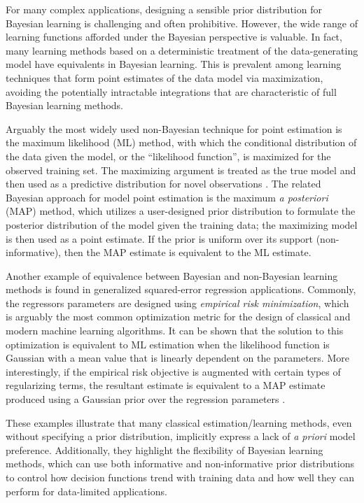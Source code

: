 \documentclass[12pt]{report}
\begin{document}
For many complex applications, designing a sensible prior distribution for Bayesian learning is challenging and often prohibitive. However, the wide range of learning functions afforded under the Bayesian perspective is valuable. In fact, many learning methods based on a deterministic treatment of the data-generating model have equivalents in Bayesian learning. This is prevalent among learning techniques that form point estimates of the data model via maximization, avoiding the potentially intractable integrations that are characteristic of full Bayesian learning methods.

Arguably the most widely used non-Bayesian technique for point estimation is the maximum likelihood (ML) method, with which the conditional distribution of the data given the model, or the ``likelihood function'', is maximized for the observed training set. The maximizing argument is treated as the true model and then used as a predictive distribution for novel observations \cite{theodoridis-ML}. The related Bayesian approach for model point estimation is the maximum \emph{a posteriori} (MAP) method, which utilizes a user-designed prior distribution to formulate the posterior distribution of the model given the training data; the maximizing model is then used as a point estimate. If the prior is uniform over its support (non-informative), then the MAP estimate is equivalent to the ML estimate.

Another example of equivalence between Bayesian and non-Bayesian learning methods is found in generalized squared-error regression applications. Commonly, the regressors parameters are designed using \emph{empirical risk minimization}, which is arguably the most common optimization metric for the design of classical and modern machine learning algorithms. It can be shown that the solution to this optimization is equivalent to ML estimation when the likelihood function is Gaussian with a mean value that is linearly dependent on the parameters. More interestingly, if the empirical risk objective is augmented with certain types of  regularizing terms, the resultant estimate is equivalent to a MAP estimate produced using a Gaussian prior over the regression parameters \cite{theodoridis-ML}. 

These examples illustrate that many classical estimation/learning methods, even without specifying a prior distribution, implicitly express a lack of \emph{a priori} model preference. Additionally, they highlight the flexibility of Bayesian learning methods, which can use both informative and non-informative prior distributions to control how decision functions trend with training data and how well they can perform for data-limited applications.
\end{document}
